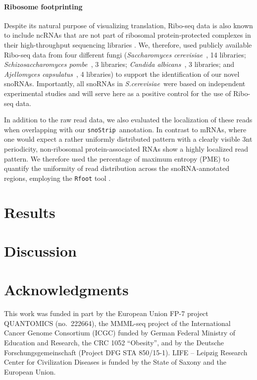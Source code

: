 \documentclass[preprint,3p,times,twocolumn]{elsarticle}
\newcommand{\sno}{snoRNA}
\newcommand{\snostrip}{\texttt{snoStrip}}
\newcommand{\Calb}{\emph{Candida albicans}}
\newcommand{\Spo}{\emph{Schizosaccharomyces pombe}}
\newcommand{\Sce}{\emph{Saccharomyces cerevisiae}}
\newcommand{\sce}{\emph{S.cerevisiae}}
\newcommand{\Aca}{\emph{Ajellomyces capsulatus}}
\begin{document}
\paragraph{Ribosome footprinting} Despite its natural purpose of
visualizing translation, Ribo-seq data is also known to include ncRNAs that
are not part of ribosomal protein-protected complexes in their
high-throughput sequencing libraries \cite{Ingolia:2014, Ji:2016}. We,
therefore, used publicly available Ribo-seq data from four different fungi
(\Sce\ \cite{Ingolia:2009}, 14 libraries; \Spo\ \cite{Duncan:2014}, 3
libraries; \Calb\ \cite{Muzzey:2014}, 3 libraries; and \Aca\
\cite{Gilmore:2015}, 4 libraries) to support the identification of our
novel \sno s.  Importantly, all \sno s in \sce\ were based on independent
experimental studies and will serve here as a positive control for the use
of Ribo-seq data.

In addition to the raw read data, we also evaluated the localization of
these reads when overlapping with our \snostrip\ annotation. In contrast to
mRNAs, where one would expect a rather uniformly distributed pattern with a
clearly visible 3nt periodicity, non-ribosomal protein-associated RNAs show
a highly localized read pattern.  We therefore used the percentage of
maximum entropy (PME) to quantify the uniformity of read distribution
across the \sno{}-annotated regions, employing the \texttt{Rfoot} tool
\cite{Ji:2016}.


\section{Results}


\section{Discussion}



\section*{Acknowledgments}

This work was funded in part by the European Union FP-7 project QUANTOMICS
(no.\ 222664), the MMML-seq project of the International Cancer Genome
Consortium (ICGC) funded by German Federal Ministry of Education and
Research, the CRC 1052 ``Obesity'', and by the Deutsche
Forschungsgemeinschaft (Project DFG STA 850/15-1). LIFE -- Leipzig Research
Center for Civilization Diseases is funded by the State of Saxony and the
European Union.



\end{document}

